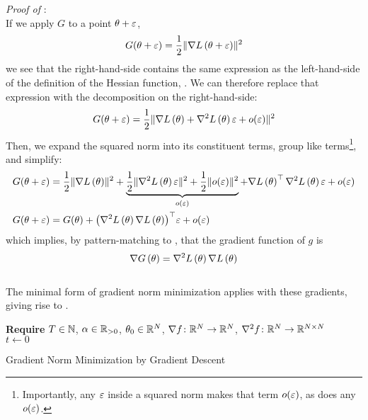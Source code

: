\documentclass[../../thesis.tex]{subfiles}
\begin{document}
\noindent \textit{Proof of }:\\
If we apply $G$ to a point $\theta + \varepsilon$,
\begin{equation}
	G(\theta + \varepsilon) = \frac{1}{2}\lVert\nabla L\left(\theta + \varepsilon\right)\rVert^2
\end{equation}
\noindent we see that the right-hand-side
contains the same expression as the left-hand-side
of the definition of the Hessian function,
.
We can therefore replace that expression
with the decomposition on the right-hand-side:
\begin{equation}
	G(\theta + \eps) = \frac{1}{2}\snorm{%
	\grad{L}{\theta} + \hess{L}{\theta}\epsilon + o(\epsilon)}
\end{equation}
\noindent Then, we expand the squared norm into its constituent terms,
group like terms\footnote{%
	Importantly, any $\varepsilon$ inside a squared norm makes that term $o(\varepsilon)$,
as does any $o(\varepsilon)$.},
and simplify:
\begin{align}
	G(\theta + \varepsilon) &= \frac{1}{2}\lVert\nabla L\left(\theta\right)\rVert^2
	+ \underbrace{\frac{1}{2}\lVert\nabla^2L\left(\theta\right)\varepsilon\rVert^2
	+ \frac{1}{2}\lVert o(\varepsilon)\rVert^2}_{o(\varepsilon)}
	+ \nabla L\left(\theta\right)^\top\nabla^2L\left(\theta\right)\varepsilon
	+ o(\varepsilon)\\
	G(\theta + \varepsilon) &= G(\theta)
	+ {\left(\nabla^2L\left(\theta\right)\nabla L\left(\theta\right)\right)}^\top\varepsilon
	+ o(\varepsilon)
\end{align}
\noindent which implies,
by pattern-matching to ,
that the gradient function of $g$ is
\begin{equation}\equationlabel{gnm-grad}
	\grad{G}{\theta} = \hess{L}{\theta}\grad{L}{\theta}
\end{equation}
\QED\\

The minimal form of gradient norm minimization
applies  with these gradients,
giving rise to .
\\
\begin{algorithm}[H]
    \SetAlgoLined{}
    \textbf{Require}
    $T\in \mathbb{N}$, $\alpha \in \mathbb{R}_{>0}$, $\theta_0 \in \mathbb{R}^N$,
    $\nabla{f}\colon\mathbb{R}^N\to\mathbb{R}^N$,
    $\nabla^2{f}\colon\mathbb{R}^N\to\mathbb{R}^{N\times N}$\\
    $t \leftarrow 0$\\
    \caption{Gradient Norm Minimization by Gradient Descent}
\end{algorithm}
\end{document}
